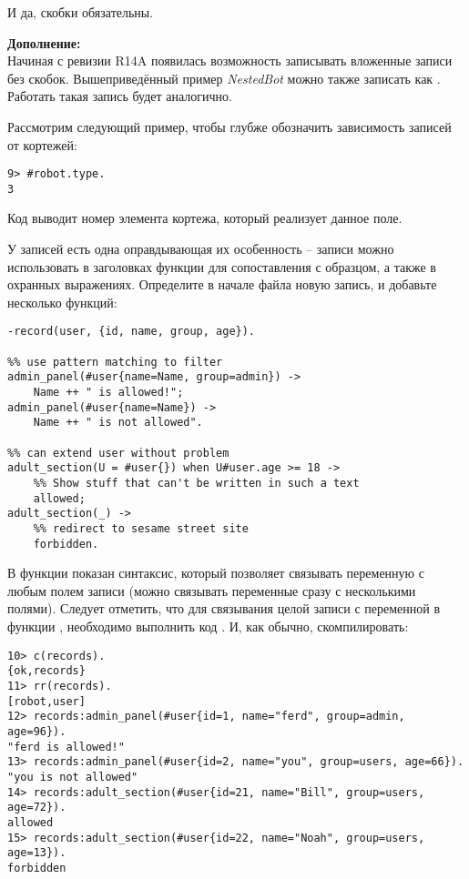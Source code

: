 И да, скобки обязательны.\\
\colorbox{lgray}
{
\begin{minipage}{1.0\linewidth}
    \textbf{Дополнение:} \\ 
    Начиная с ревизии R14A появилась возможность записывать вложенные записи без скобок.
    Вышеприведённый пример \emph{NestedBot} можно также записать как .
    Работать такая запись будет аналогично.
\end{minipage}
}

Рассмотрим следующий пример, чтобы глубже обозначить зависимость записей от кортежей:
\begin{lstlisting}[style=erlang]
9> #robot.type.
3
\end{lstlisting}

Код выводит номер элемента кортежа, который реализует данное поле.

У записей есть одна оправдывающая их особенность \--- записи можно использовать в заголовках функции для сопоставления с образцом, а также в охранных выражениях.
Определите в начале файла новую запись, и добавьте несколько функций:
\begin{lstlisting}[style=erlang]
-record(user, {id, name, group, age}).
 
%% use pattern matching to filter
admin_panel(#user{name=Name, group=admin}) ->
    Name ++ " is allowed!";
admin_panel(#user{name=Name}) ->
    Name ++ " is not allowed".
 
%% can extend user without problem
adult_section(U = #user{}) when U#user.age >= 18 ->
    %% Show stuff that can't be written in such a text
    allowed;
adult_section(_) ->
    %% redirect to sesame street site
    forbidden.
\end{lstlisting}

В функции  показан синтаксис, который позволяет связывать переменную с любым полем записи (можно связывать переменные сразу с несколькими полями).
Следует отметить, что для связывания целой записи с переменной в функции , необходимо выполнить код .
И, как обычно, скомпилировать:
\begin{lstlisting}[style=erlang]
10> c(records).
{ok,records}
11> rr(records).
[robot,user]
12> records:admin_panel(#user{id=1, name="ferd", group=admin, age=96}).
"ferd is allowed!"
13> records:admin_panel(#user{id=2, name="you", group=users, age=66}).
"you is not allowed"
14> records:adult_section(#user{id=21, name="Bill", group=users, age=72}).
allowed
15> records:adult_section(#user{id=22, name="Noah", group=users, age=13}).
forbidden
\end{lstlisting}

